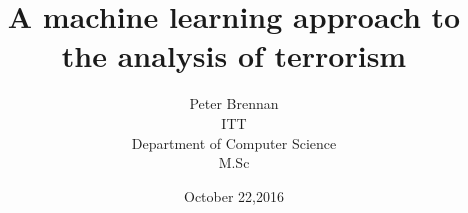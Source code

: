 \documentclass[options]{report}
\begin{document}

\title{A machine learning approach to the analysis of terrorism}
\author{Peter Brennan\\ITT\\Department of Computer Science\\M.Sc}
\date{October 22,2016}




\maketitle
{}


\tableofcontents
\listoffigures
\listoftables

%
%
%
%
%

\pagestyle{headings}











\end{document}
